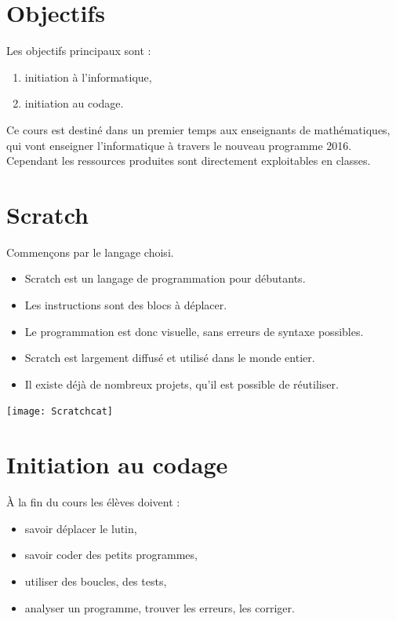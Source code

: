 \documentclass[class=report,crop=false, 12pt]{standalone}
\begin{document}


\pagestyle{empty}

\section{Objectifs}

Les objectifs principaux sont :
\begin{enumerate}
\item initiation à l'informatique,
\item initiation au codage.
\end{enumerate}


Ce cours est destiné dans un premier temps aux enseignants de mathématiques, qui vont enseigner l'informatique à travers le nouveau programme 2016.
Cependant les ressources produites sont directement exploitables en classes.


\section{Scratch}

Commençons par le langage choisi.

\begin{minipage}{0.7\textwidth}
\begin{itemize}
  \item Scratch est un langage de programmation pour débutants. 
  \item Les instructions sont des blocs à déplacer.
  \item Le programmation est donc visuelle, sans erreurs de syntaxe possibles.
  \item Scratch est largement diffusé et utilisé dans le monde entier.
  \item Il existe déjà de nombreux projets, qu'il est possible de réutiliser.
\end{itemize}
\end{minipage}
\begin{minipage}{0.29\textwidth}
  \centering
  \texttt{[image: Scratchcat]}
\end{minipage}



\section{Initiation au codage}

\`A la fin du cours les élèves doivent :
\begin{itemize}
  \item savoir déplacer le lutin,

  \item savoir coder des petits programmes,
    
  \item utiliser des boucles, des tests,
  
  \item analyser un programme, trouver les erreurs, les corriger.
\end{itemize}
\end{document}
